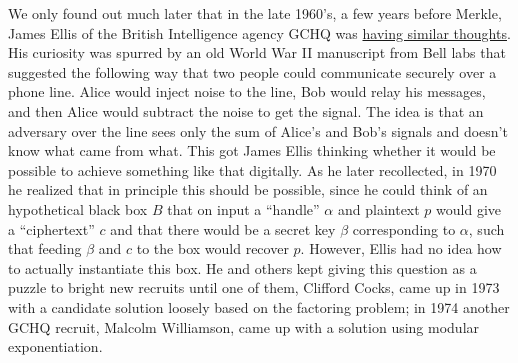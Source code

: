 We only found out much later that in the late 1960's, a few years before
Merkle, James Ellis of the British Intelligence agency GCHQ was
\href{http://cryptome.org/jya/ellisdoc.htm}{having similar thoughts}.
His curiosity was spurred by an old World War II manuscript from Bell
labs that suggested the following way that two people could communicate
securely over a phone line. Alice would inject noise to the line, Bob
would relay his messages, and then Alice would subtract the noise to get
the signal. The idea is that an adversary over the line sees only the
sum of Alice's and Bob's signals and doesn't know what came from what.
This got James Ellis thinking whether it would be possible to achieve
something like that digitally. As he later recollected, in 1970 he
realized that in principle this should be possible, since he could think
of an hypothetical black box \(B\) that on input a ``handle'' \(\alpha\)
and plaintext \(p\) would give a ``ciphertext'' \(c\) and that there
would be a secret key \(\beta\) corresponding to \(\alpha\), such that
feeding \(\beta\) and \(c\) to the box would recover \(p\). However,
Ellis had no idea how to actually instantiate this box. He and others
kept giving this question as a puzzle to bright new recruits until one
of them, Clifford Cocks, came up in 1973 with a candidate solution
loosely based on the factoring problem; in 1974 another GCHQ recruit,
Malcolm Williamson, came up with a solution using modular
exponentiation.

